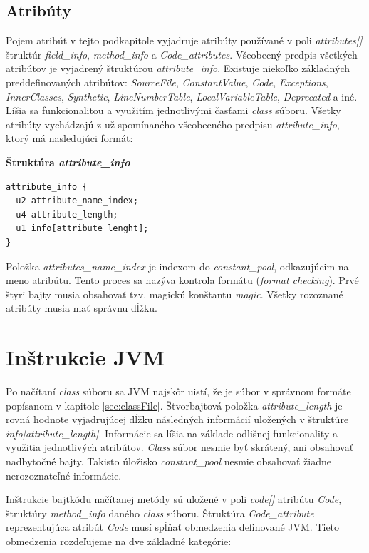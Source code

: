 \documentclass[11pt,final,oneside]{fithesis}
\newenvironment{example}[1]
{
\vspace{3mm}
\noindent\textbf{#1}
\vspace{2mm}
}
{
\vspace{3mm}
}
\begin{document}
\subsection{Atribúty}
\label{sec:attributes}
Pojem atribút v tejto podkapitole vyjadruje atribúty používané v poli
\textit{attributes[]} štruktúr \textit{field\_info}, \textit{method\_info} a
\textit{Code\_attributes}. Všeobecný predpis všetkých atribútov je vyjadrený
štruktúrou \textit{attribute\_info}. Existuje niekoľko základných
preddefinovaných atribútov: \textit{SourceFile}, \textit{ConstantValue},
\textit{Code}, \textit{Exceptions}, \textit{InnerClasses}, \textit{Synthetic},
\textit{LineNumberTable}, \textit{LocalVariableTable}, \textit{Deprecated} a
iné. Líšia sa funkcionalitou a využitím jednotlivými časťami \textit{class}
súboru. Všetky atribúty vychádzajú z už spomínaného všeobecného predpisu
\textit{attribute\_info}, ktorý má nasledujúci formát:

\begin{example}{Štruktúra \textit{attribute\_info}}
\begin{verbatim}
attribute_info {
  u2 attribute_name_index;
  u4 attribute_length;
  u1 info[attribute_lenght];
}
\end{verbatim}
\end{example}

Položka \textit{attributes\_name\_index} je indexom do \textit{constant\_pool},
odkazujúcim na meno atribútu. Tento proces sa nazýva kontrola formátu
(\textit{format checking}). Prvé štyri bajty musia obsahovať tzv. magickú
konštantu \textit{magic}. Všetky rozoznané atribúty musia mať správnu dĺžku.

\section{Inštrukcie JVM}
Po načítaní \textit{class} súboru sa JVM najskôr uistí, že je súbor
v správnom formáte popísanom v kapitole \ref{sec:classFile}. Štvorbajtová
položka \textit{attribute\_length} je rovná hodnote vyjadrujúcej
dĺžku následných informácií uložených v štruktúre
\textit{info[attribute\_length]}.
Informácie sa líšia na základe odlišnej funkcionality a využitia jednotlivých
atribútov. \textit{Class} súbor nesmie byť skrátený, ani obsahovať nadbytočné
bajty. Takisto úložisko \textit{constant\_pool} nesmie obsahovať žiadne
nerozoznateľné informácie.

Inštrukcie bajtkódu načítanej metódy sú uložené v poli \textit{code[]}
atribútu \textit{Code}, štruktúry \textit{method\_info} daného \textit{class}
súboru. Štruktúra \textit{Code\_attribute} reprezentujúca atribút \textit{Code}
musí spĺňať obmedzenia definované JVM. Tieto obmedzenia rozdeľujeme na dve
základné kategórie: 
\end{document}
